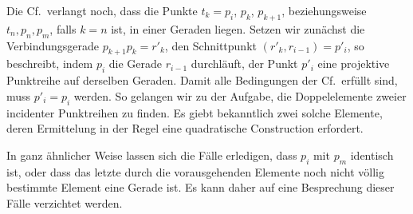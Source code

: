 \documentclass[11pt]{article}
\newcommand{\Cf}{\textup{Cf.}}
\begin{document}
Die \Cf\ verlangt noch, dass die Punkte $t_k=p_i$, $p_k$, $p_{k+1}$, beziehungsweise $t_n,p_n,p_m$, falls $k=n$ ist, in einer Geraden liegen. Setzen wir zunächst die Verbindungsgerade $p_{k+1}p_k=r'_k$, den Schnittpunkt $(r'_k,r_{i-1})=p'_i$, so beschreibt, indem $p_i$ die Gerade $r_{i-1}$ durchläuft, der Punkt $p'_i$ eine projektive Punktreihe auf derselben Geraden. Damit alle Bedingungen der \Cf\ erfüllt sind, muss $p'_i=p_i$ werden. So gelangen wir zu der Aufgabe, die Doppelelemente zweier incidenter Punktreihen zu finden. Es giebt bekanntlich zwei solche Elemente, deren Ermittelung in der Regel eine quadratische Construction erfordert.

In ganz ähnlicher Weise lassen sich die Fälle erledigen, dass $p_i$ mit $p_m$ identisch ist, oder dass das letzte durch die vorausgehenden Elemente noch nicht völlig bestimmte Element eine Gerade ist. Es kann daher auf eine Besprechung dieser Fälle verzichtet werden.
\end{document}
